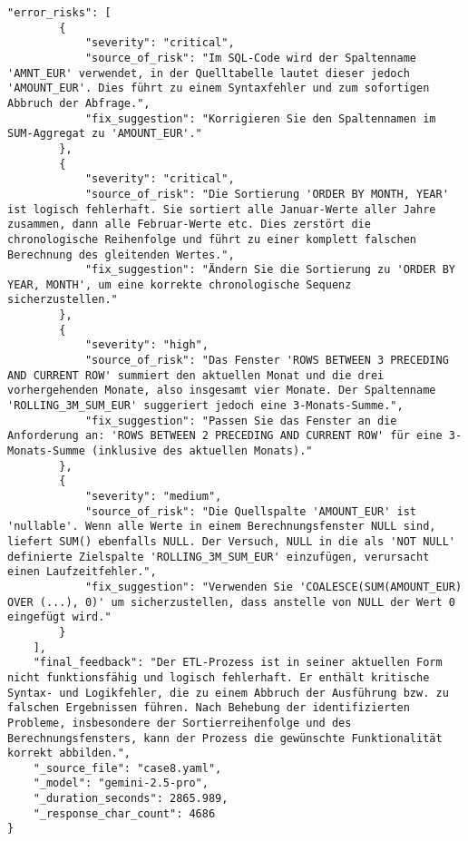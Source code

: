 \begin{lstlisting}[caption={Ausgabe: GEMINI 2.5 Pro Anwendungsfall 8 Robustheitsdurchlauf},label={gemini_case8_prompt3}]
    "error_risks": [
        {
            "severity": "critical",
            "source_of_risk": "Im SQL-Code wird der Spaltenname 'AMNT_EUR' verwendet, in der Quelltabelle lautet dieser jedoch 'AMOUNT_EUR'. Dies führt zu einem Syntaxfehler und zum sofortigen Abbruch der Abfrage.",
            "fix_suggestion": "Korrigieren Sie den Spaltennamen im SUM-Aggregat zu 'AMOUNT_EUR'."
        },
        {
            "severity": "critical",
            "source_of_risk": "Die Sortierung 'ORDER BY MONTH, YEAR' ist logisch fehlerhaft. Sie sortiert alle Januar-Werte aller Jahre zusammen, dann alle Februar-Werte etc. Dies zerstört die chronologische Reihenfolge und führt zu einer komplett falschen Berechnung des gleitenden Wertes.",
            "fix_suggestion": "Ändern Sie die Sortierung zu 'ORDER BY YEAR, MONTH', um eine korrekte chronologische Sequenz sicherzustellen."
        },
        {
            "severity": "high",
            "source_of_risk": "Das Fenster 'ROWS BETWEEN 3 PRECEDING AND CURRENT ROW' summiert den aktuellen Monat und die drei vorhergehenden Monate, also insgesamt vier Monate. Der Spaltenname 'ROLLING_3M_SUM_EUR' suggeriert jedoch eine 3-Monats-Summe.",
            "fix_suggestion": "Passen Sie das Fenster an die Anforderung an: 'ROWS BETWEEN 2 PRECEDING AND CURRENT ROW' für eine 3-Monats-Summe (inklusive des aktuellen Monats)."
        },
        {
            "severity": "medium",
            "source_of_risk": "Die Quellspalte 'AMOUNT_EUR' ist 'nullable'. Wenn alle Werte in einem Berechnungsfenster NULL sind, liefert SUM() ebenfalls NULL. Der Versuch, NULL in die als 'NOT NULL' definierte Zielspalte 'ROLLING_3M_SUM_EUR' einzufügen, verursacht einen Laufzeitfehler.",
            "fix_suggestion": "Verwenden Sie 'COALESCE(SUM(AMOUNT_EUR) OVER (...), 0)' um sicherzustellen, dass anstelle von NULL der Wert 0 eingefügt wird."
        }
    ],
    "final_feedback": "Der ETL-Prozess ist in seiner aktuellen Form nicht funktionsfähig und logisch fehlerhaft. Er enthält kritische Syntax- und Logikfehler, die zu einem Abbruch der Ausführung bzw. zu falschen Ergebnissen führen. Nach Behebung der identifizierten Probleme, insbesondere der Sortierreihenfolge und des Berechnungsfensters, kann der Prozess die gewünschte Funktionalität korrekt abbilden.",
    "_source_file": "case8.yaml",
    "_model": "gemini-2.5-pro",
    "_duration_seconds": 2865.989,
    "_response_char_count": 4686
}
\end{lstlisting}

